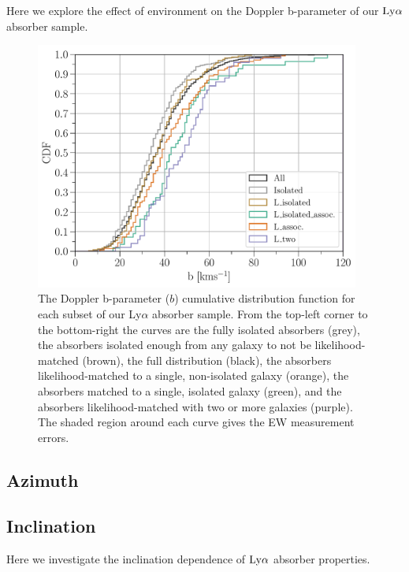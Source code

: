 \documentclass[twocolumn,tighten]{aastex62}
\begin{document}
Here we explore the effect of environment on the Doppler b-parameter of our $\rm Ly\alpha$ absorber sample.
\begin{figure}[ht!]
        \centering
        \vspace{0pt}
        \includegraphics[width=0.95\textwidth]{hist(b)_all6_bins1_6_min_maxEW_0_10000.pdf}
        \caption{\small{The Doppler b-parameter ($b$) cumulative distribution function for each subset of our Ly$\alpha$ absorber sample. From the top-left corner to the bottom-right the curves are the fully isolated absorbers (grey), the absorbers isolated enough from any galaxy to not be likelihood-matched (brown), the full distribution (black), the absorbers likelihood-matched to a single, non-isolated galaxy (orange), the absorbers matched to a single, isolated galaxy (green), and the absorbers likelihood-matched with two or more galaxies (purple). The shaded region around each curve gives the EW measurement errors.}}
        \vspace{-5pt}
        \label{cdf_b}
\end{figure}




\subsection{Azimuth}

\subsection{Inclination}

Here we investigate the inclination dependence of $\rm Ly\alpha$ absorber properties.
\end{document}
